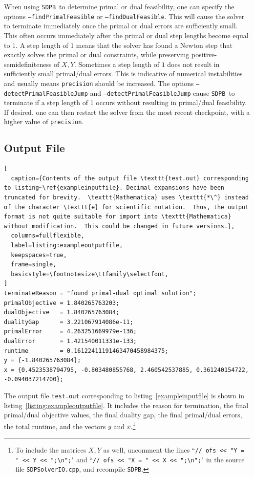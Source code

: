\documentclass[12pt]{article}
\numberwithin{equation}{section}
\newcommand\SDPB{\texttt{SDPB}}
\begin{document}
When using \SDPB\ to determine primal or dual feasibility, one can specify the options \texttt{--findPrimalFeasible} or \texttt{--findDualFeasible}.  This will cause the solver to terminate immediately once the primal or dual errors are sufficiently small.  This often occurs immediately after the primal or dual step lengths become equal to $1$.  A step length of $1$ means that the solver has found a Newton step that exactly solves the primal or dual constraints, while preserving positive-semidefiniteness of $X,Y$.  Sometimes a step length of $1$ does not result in sufficiently small primal/dual errors.  This is indicative of numerical instabilities and usually means \texttt{precision} should be increased.  The options \texttt{--detectPrimalFeasibleJump} and \texttt{--detectPrimalFeasibleJump} cause \SDPB\ to terminate if a step length of 1 occurs without resulting in primal/dual feasibility.  If desired, one can then restart the solver from the most recent checkpoint, with a higher value of \texttt{precision}.


\subsection{Output File}

\begin{lstlisting}[
  caption={Contents of the output file \texttt{test.out} corresponding to listing~\ref{exampleinputfile}. Decimal expansions have been truncated for brevity.  \texttt{Mathematica} uses \texttt{*\^} instead of the character \texttt{e} for scientific notation.  Thus, the output format is not quite suitable for import into \texttt{Mathematica} without modification.  This could be changed in future versions.},
  columns=fullflexible,
  label=listing:exampleoutputfile,
  keepspaces=true,
  frame=single,
  basicstyle=\footnotesize\ttfamily\selectfont,
]
terminateReason = "found primal-dual optimal solution";
primalObjective = 1.840265763203;
dualObjective   = 1.840265763084;
dualityGap      = 3.221067914086e-11;
primalError     = 4.263251669979e-136;
dualError       = 1.421540011331e-133;
runtime         = 0.16122411191463470458984375;
y = {-1.840265763084};
x = {0.4523538794795, -0.803480855768, 2.460542537885, 0.361240154722, -0.094037214700};
\end{lstlisting}


The output file \texttt{test.out} corresponding to listing~\ref{exampleinputfile} is shown in listing~\ref{listing:exampleoutputfile}. It includes the reason for termination, the final primal/dual objective values, the final duality gap, the final primal/dual errors, the total runtime, and the vectors $y$ and $x$.\footnote{To include the matrices $X,Y$ as well, uncomment the lines ``\texttt{// ofs << "Y = " << Y << ";\textbackslash n";}" and ``\texttt{// ofs << "X = " << X << ";\textbackslash n";}" in the source file \texttt{SDPSolverIO.cpp}, and recompile \SDPB.}
\end{document}
